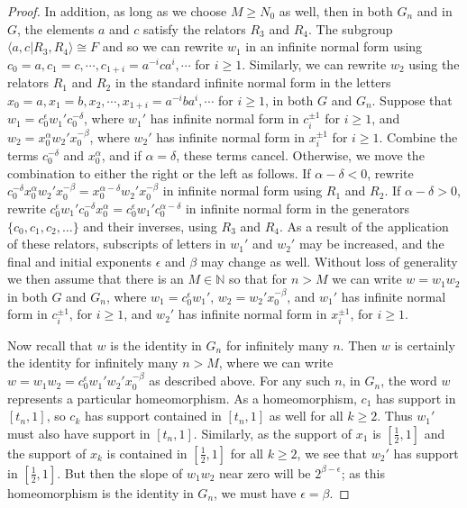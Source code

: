 \documentclass[11pt]{amsart}
\begin{document}
\begin{proof}
In addition, as long as we choose $M \geq N_0$  as well, then
in both $G_n$ and in $G$, the elements $a$ and $c$ satisfy the relators $R_3$ and $R_4$.
The subgroup $\langle a,c | R_3,R_4 \rangle \cong F$ and so we
can rewrite $w_1$ in an infinite
normal form using $c_0=a, c_1=c, \cdots  ,c_{1+i}= a^{-i} c a^i, \cdots$ for $i
\geq 1$. Similarly, we can rewrite $w_2$ using the relators $R_1$ and
$R_2$ in the standard infinite normal form in the letters $x_0=a, x_1=b, x_2, \cdots ,
x_{1+i}=a^{-i} b a^i, \cdots$ for $i\geq 1$, in both $G$ and $G_n$.
Suppose that $w_1=c_0^{\epsilon} w_1' c_0^{-\delta}$, where $w_1'$ has infinite
normal form in $c_i^{\pm 1}$ for $i \geq 1$, and $w_2=x_0^{\alpha} w_2'
x_0^{-\beta}$, where $w_2'$ has infinite normal form in $x_i^{\pm
1}$ for $i \geq 1$. Combine the terms $c_0^{-\delta}$ and $x_0^{\alpha}$, and if $\alpha=\delta$, these terms cancel. Otherwise, we move the combination to either the right or the left as follows. If $\alpha-\delta < 0$, rewrite $c_0^{-\delta}x_0^{\alpha}w_2'x_0^{-\beta}=x_0^{\alpha-\delta}w_2'x_0^{-\beta}$ in infinite normal form using $R_1$ and $R_2$. If $\alpha-\delta>0$, rewrite $c_0^{\epsilon} w_1' c_0^{-\delta}x_0^{\alpha}=c_0^{\epsilon} w_1' c_0^{\alpha-\delta}$ in infinite normal form in the generators $\{c_0, c_1, c_2, \dots \}$ and their inverses, using $R_3$ and $R_4$.
As a result of the application of these relators, subscripts of letters in $w_1'$ and $w_2'$ may be increased, and the final and initial exponents $\epsilon$ and $\beta$ may change as well.  Without loss of generality we then assume that there is an $M \in {\mathbb N}$ so that for $n>M$ we can write
$w=w_1w_2$ in both $G$ and $G_n$, where $w_1=c_0^{\epsilon}
w_1'$, $w_2= w_2' x_0^{-\beta}$, and $w_1'$ has infinite normal form
in $c_i^{\pm 1}$, for $i \geq 1$, and $w_2'$ has infinite normal form in
$x_i^{\pm 1}$, for $i \geq 1$.

Now recall that $w$ is the identity in $G_n$ for
infinitely many $n$. Then $w$ is certainly the identity for
infinitely many $n>M$, where we can write
$w=w_1w_2=c_0^{\epsilon}w_1'w_2'x_0^{-\beta}$ as described above. For any such $n$, in $G_n$, the word $w$ represents a
particular homeomorphism. As a homeomorphism, $c_1$ has support in
$[t_{n},1]$, so $c_k$ has support contained in $[t_n,1]$ as well for all $k \geq 2$.  Thus
$w_1'$ must also have support in $[t_{n},1]$. Similarly,
as the support of $x_1$ is $[\frac{1}{2},1]$ and the support of $x_k$ is contained in $[\frac{1}{2},1]$ for all $k \geq 2$,
we see that $w_2'$ has support in $[\frac{1}{2}, 1]$. But then the slope of
$w_1w_2$ near zero will be $2^{\beta-\epsilon}$; as this
homeomorphism is the identity in $G_{n}$, we must have
$\epsilon=\beta$.


\end{proof}
\end{document}
